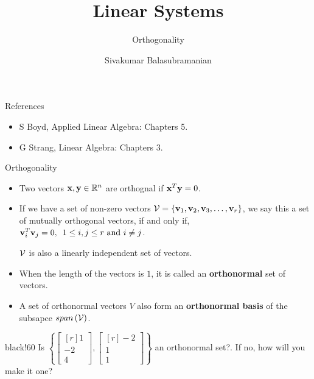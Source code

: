 \documentclass[aspectratio=169]{beamer}
\title{Linear Systems}
\subtitle{Orthogonality}
\author{Sivakumar Balasubramanian}
\institute[Christian Medical College] %
{
  \inst{}%
  Department of Bioengineering\\
  Christian Medical College, Bagayam\\
  Vellore 632002
}
\date{}
\def\mf{\ensuremath\mathbf}
\def\mb{\ensuremath\mathbb}
\def\mc{\ensuremath\mathcal}
\newcommand{\demoex}[2]{\onslide<#1->\begin{color}{black!60} #2 \end{color}}
\begin{document}
\begin{frame}
  \titlepage
\end{frame}

\begin{frame}[t]{References}
\begin{itemize}
    \item S Boyd, Applied Linear Algebra: Chapters 5.
    \item G Strang, Linear Algebra: Chapters 3.
\end{itemize}
\end{frame}


\begin{frame}[t]{Orthogonality}
\vspace{-0.25cm}
\begin{itemize}
\item Two vectors $\mf{x}, \mf{y} \in \mb{R}^n$ are orthognal if $\mf{x}^T\mf{y} = 0$.
\begin{center}
\end{center}

\item If we have a set of non-zero vectors $\mc{V} = \left\{\mf{v}_1, \mf{v}_2, \mf{v}_3, \ldots, \mf{v}_r\right\}$, we say this a set of mutually orthogonal vectors, if and only if, $\mf{v}_i^T\mf{v}_j = 0, \,\,\, 1 \leq i, j \leq r \text{ and } i \neq j$.

$\mc{V}$ is also a linearly independent set of vectors.

\item When the length of the vectors is $1$, it is called an \textbf{orthonormal} set of vectors.

\item A set of orthonormal vectors $V$ also form an \textbf{orthonormal basis} of the subsapce $span \left(\mc{V}\right)$.

\end{itemize}

\demoex{2}{
Is $\left\{\begin{bmatrix*}[r]1\\-2\\4\end{bmatrix*}, \begin{bmatrix*}[r]-2\\1\\1\end{bmatrix*}\right\}$ an orthonormal set?. If no, how will you make it one?
}

\end{frame}
\end{document}
